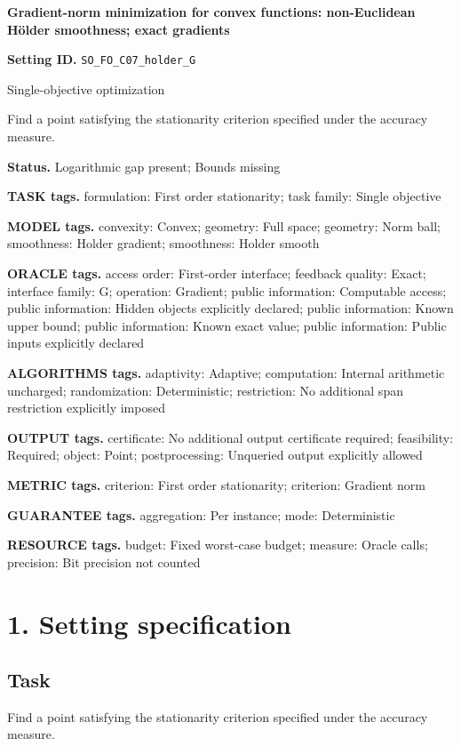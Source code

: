 \documentclass[10pt,a4paper]{article}
\begin{document}
\raggedright

{\LARGE\bfseries\sffamily\color{AtlasNavy} Gradient-norm minimization for convex functions: non-Euclidean Hölder smoothness; exact gradients\par}\vspace{5pt}
\textbf{Setting ID.} \texttt{SO\_\allowbreak{}FO\_\allowbreak{}C07\_\allowbreak{}holder\_\allowbreak{}G}

Single-objective optimization

Find a point satisfying the stationarity criterion specified under the accuracy measure.

\textbf{Status.} Logarithmic gap present; Bounds missing

\textbf{TASK tags.} formulation: First order stationarity; task family: Single objective

\textbf{MODEL tags.} convexity: Convex; geometry: Full space; geometry: Norm ball; smoothness: Holder gradient; smoothness: Holder smooth

\textbf{ORACLE tags.} access order: First-order interface; feedback quality: Exact; interface family: G; operation: Gradient; public information: Computable access; public information: Hidden objects explicitly declared; public information: Known upper bound; public information: Known exact value; public information: Public inputs explicitly declared

\textbf{ALGORITHMS tags.} adaptivity: Adaptive; computation: Internal arithmetic uncharged; randomization: Deterministic; restriction: No additional span restriction explicitly imposed

\textbf{OUTPUT tags.} certificate: No additional output certificate required; feasibility: Required; object: Point; postprocessing: Unqueried output explicitly allowed

\textbf{METRIC tags.} criterion: First order stationarity; criterion: Gradient norm

\textbf{GUARANTEE tags.} aggregation: Per instance; mode: Deterministic

\textbf{RESOURCE tags.} budget: Fixed worst-case budget; measure: Oracle calls; precision: Bit precision not counted

\section{1. Setting specification}
\subsection{Task}
Find a point satisfying the stationarity criterion specified under the accuracy measure.
\end{document}
